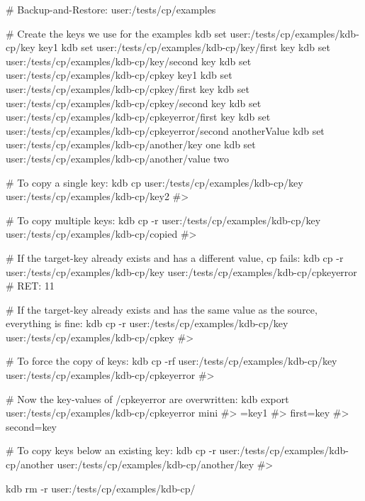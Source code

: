 \begin{DoxyCode}
# Backup-and-Restore: user:/tests/cp/examples

# Create the keys we use for the examples
kdb set user:/tests/cp/examples/kdb-cp/key key1
kdb set user:/tests/cp/examples/kdb-cp/key/first key
kdb set user:/tests/cp/examples/kdb-cp/key/second key
kdb set user:/tests/cp/examples/kdb-cp/cpkey key1
kdb set user:/tests/cp/examples/kdb-cp/cpkey/first key
kdb set user:/tests/cp/examples/kdb-cp/cpkey/second key
kdb set user:/tests/cp/examples/kdb-cp/cpkeyerror/first key
kdb set user:/tests/cp/examples/kdb-cp/cpkeyerror/second anotherValue
kdb set user:/tests/cp/examples/kdb-cp/another/key one
kdb set user:/tests/cp/examples/kdb-cp/another/value two

# To copy a single key:
kdb cp user:/tests/cp/examples/kdb-cp/key user:/tests/cp/examples/kdb-cp/key2
#>

# To copy multiple keys:
kdb cp -r user:/tests/cp/examples/kdb-cp/key user:/tests/cp/examples/kdb-cp/copied
#>

# If the target-key already exists and has a different value, cp fails:
kdb cp -r user:/tests/cp/examples/kdb-cp/key user:/tests/cp/examples/kdb-cp/cpkeyerror
# RET: 11

# If the target-key already exists and has the same value as the source, everything is fine:
kdb cp -r user:/tests/cp/examples/kdb-cp/key user:/tests/cp/examples/kdb-cp/cpkey
#>

# To force the copy of keys:
kdb cp -rf user:/tests/cp/examples/kdb-cp/key user:/tests/cp/examples/kdb-cp/cpkeyerror
#>

# Now the key-values of /cpkeyerror are overwritten:
kdb export user:/tests/cp/examples/kdb-cp/cpkeyerror mini
#> =key1
#> first=key
#> second=key

# To copy keys below an existing key:
kdb cp -r user:/tests/cp/examples/kdb-cp/another user:/tests/cp/examples/kdb-cp/another/key
#>

kdb rm -r user:/tests/cp/examples/kdb-cp/
\end{DoxyCode}
 